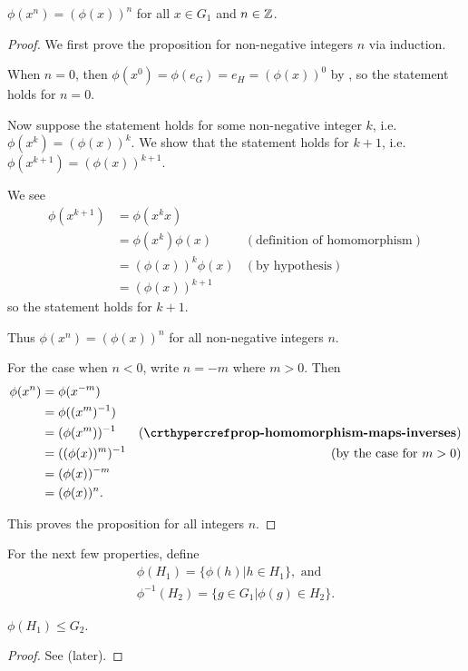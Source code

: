 \begin{proposition}
    $\phi(x^n) = (\phi(x))^n$ for all $x \in G_1$ and $n \in \mathbb{Z}$.
\end{proposition}
\begin{proof}
    We first prove the proposition for non-negative integers $n$ via induction.

    When $n = 0$, then $\phi(x^0) = \phi(e_G) = e_H = (\phi(x))^0$ by , so the statement holds for $n = 0$.

    Now suppose the statement holds for some non-negative integer $k$, i.e. $\phi(x^k) = (\phi(x))^k$. We show that the statement holds for $k + 1$, i.e. $\phi(x^{k+1}) = (\phi(x))^{k+1}$.

    We see
    \begin{align*}
        \phi(x^{k+1}) &= \phi(x^kx) \\
        &= \phi(x^k)\phi(x) & (\text{definition of homomorphism})\\
        &= (\phi(x))^k\phi(x) & (\text{by hypothesis})\\
        &= (\phi(x))^{k+1}
    \end{align*}
    so the statement holds for $k+1$.

    Thus $\phi(x^n) = (\phi(x))^n$ for all non-negative integers $n$.

    For the case when $n < 0$, write $n = -m$ where $m > 0$. Then
    \begin{align*}
        \phi(x^n) &= \phi(x^{-m})\\
        &= \phi((x^m)^{-1})\\
        &= (\phi(x^m))^{-1} & (\myref{prop-homomorphism-maps-inverses})\\
        &= ((\phi(x))^m)^{-1} & (\text{by the case for } m>0)\\
        &= (\phi(x))^{-m}\\
        &= (\phi(x))^n.
    \end{align*}

    This proves the proposition for all integers $n$.
\end{proof}

For the next few properties, define
\begin{gather*}
    \phi(H_1) = \{\phi(h) \vert h \in H_1\}, \text{ and}\\
    \phi^{-1}(H_2) = \{g \in G_1 \vert \phi(g) \in H_2\}.
\end{gather*}

\begin{proposition}
    $\phi(H_1) \leq G_2$.
\end{proposition}
\begin{proof}
    See  (later).
\end{proof}


